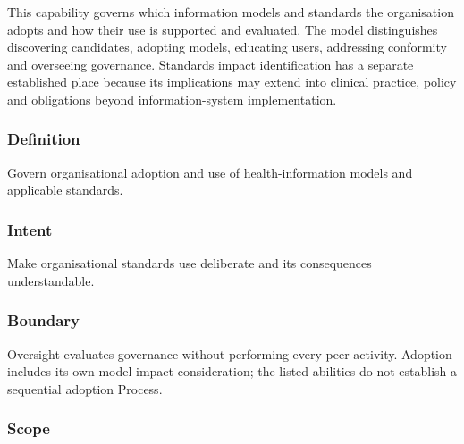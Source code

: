 This capability governs which information models and standards the organisation adopts and how their use is supported and evaluated. The model distinguishes discovering candidates, adopting models, educating users, addressing conformity and overseeing governance. Standards impact identification has a separate established place because its implications may extend into clinical practice, policy and obligations beyond information-system implementation.

\subsubsection*{Definition}

Govern organisational adoption and use of health-information models and applicable standards.

\subsubsection*{Intent}

Make organisational standards use deliberate and its consequences understandable.

\subsubsection*{Boundary}

Oversight evaluates governance without performing every peer activity. Adoption includes its own model-impact consideration; the listed abilities do not establish a sequential adoption Process.

\subsubsection*{Scope}
